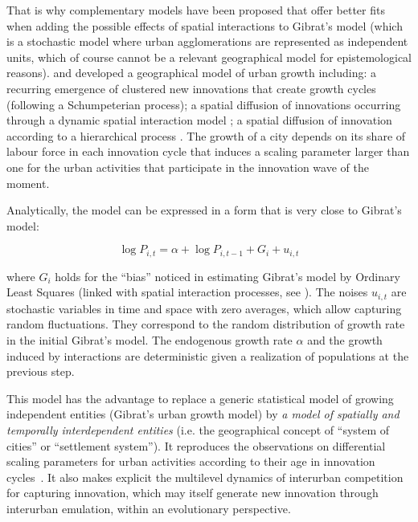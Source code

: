 \documentclass[11pt]{article}
\begin{document}
That is why complementary models have been proposed that offer better fits when adding the possible effects of spatial interactions to Gibrat's model (which is a stochastic model where urban agglomerations are represented as independent units, which of course cannot be a relevant geographical model for epistemological reasons). \cite{favaro2007croissance} and \cite{favaro2011gibrat} developed a geographical model of urban growth including: a recurring emergence of clustered new innovations that create growth cycles (following a Schumpeterian process); a spatial diffusion of innovations occurring through a dynamic spatial interaction model \cite{wilson1971family}; a spatial diffusion of innovation according to a hierarchical process \cite{hagerstrand1952propagation}. The growth of a city depends on its share of labour force in each innovation cycle that induces a scaling parameter larger than one for the urban activities that participate in the innovation wave of the moment.

Analytically, the model can be expressed in a form that is very close to Gibrat’s model:

\begin{equation}
    \log{P_{i,t}} = \alpha + \log{P_{i,t-1}} + G_i + u_{i,t}
\end{equation}

where $G_i$ holds for the ``bias'' noticed in estimating Gibrat's model by Ordinary Least Squares (linked with spatial interaction processes, see \cite{favaro2011gibrat}). The noises $u_{i,t}$ are stochastic variables in time and space with zero averages, which allow capturing random fluctuations. They correspond to the random distribution of growth rate in the initial Gibrat's model. The endogenous growth rate $\alpha$ and the growth induced by interactions are deterministic given a realization of populations at the previous step.

This model has the advantage to replace a generic statistical model of growing independent entities (Gibrat’s urban growth model) by \emph{a model of spatially and temporally interdependent entities} (i.e. the geographical concept of ``system of cities'' or ``settlement system''). It reproduces the observations on differential scaling parameters for urban activities according to their age in innovation cycles~\cite{pumain2006evolutionary}. It also makes explicit the multilevel dynamics of interurban competition for capturing innovation, which may itself generate new innovation through interurban emulation, within an evolutionary perspective. 
\end{document}
